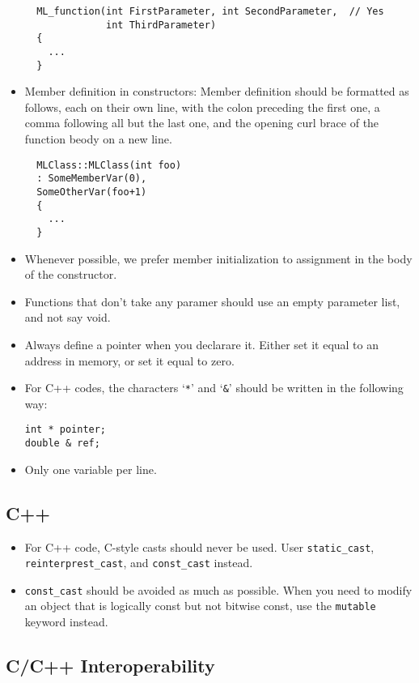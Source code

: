 \documentclass[10pt,letter,relax]{SANDreport}
\begin{document}
\begin{itemize}
\begin{verbatim}
  ML_function(int FirstParameter, int SecondParameter,  // Yes
              int ThirdParameter)
  {
    ...
  }      
  \end{verbatim}
\item Member definition in constructors: Member definition should be formatted
  as follows, each on their own line, with the colon preceding the first one,
a comma following all but the last one, and the opening curl brace of the
  function beody on a new line.
  \begin{verbatim}
  MLClass::MLClass(int foo)
  : SomeMemberVar(0),
  SomeOtherVar(foo+1)
  {
    ...
  }    
  \end{verbatim}
\item Whenever possible, we prefer member initialization to assignment in the
  body of the constructor.
\item Functions that don't take any paramer should use an empty parameter
list, and not say void.
\item Always define a pointer when you  declarare it. Either set it equal to
an address in memory, or set it equal to zero.
\item For C++ codes, the characters `\verb!*!' and `\verb!&!' should be
written in the following way:
\begin{verbatim}
int * pointer;
double & ref;
\end{verbatim}
\item Only one variable per line.
\end{itemize}

\subsection{C++}

\begin{itemize}
\item For C++ code, C-style casts should never be used. User
  \verb!static_cast!, \verb!reinterprest_cast!, and \verb!const_cast! instead.
\item \verb!const_cast! should be avoided as much as possible. When you need
to modify an object that is logically const but not bitwise const, use the
\verb!mutable! keyword instead.

\end{itemize}

\subsection{C/C++ Interoperability}
\end{document}
